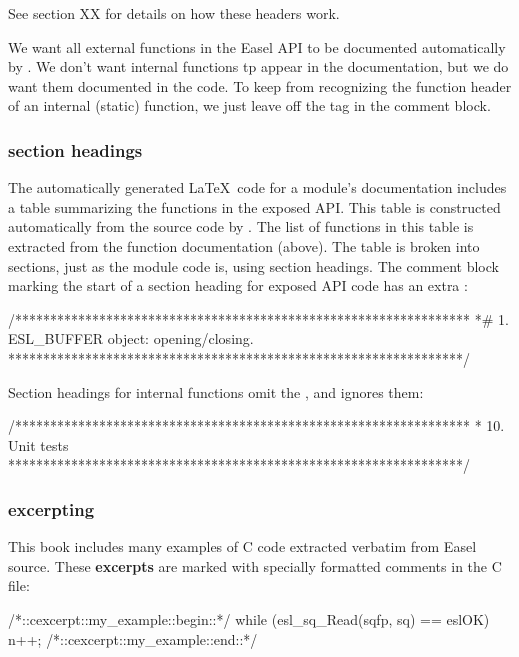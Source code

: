 See section XX for details on how these headers work.

We want all external functions in the Easel API to be documented
automatically by . We don't want internal functions tp
appear in the documentation, but we do want them documented in the
code.  To keep  from recognizing the function header of
an internal (static) function, we just leave off the 
tag in the comment block.   

\subsubsection{section headings}

The automatically generated \LaTeX\ code for a module's documentation
includes a table summarizing the functions in the exposed API. This
table is constructed automatically from the source code by
. The list of functions in this table is extracted
from the function documentation (above). The table is broken into
sections, just as the module code is, using section headings. The
comment block marking the start of a section heading for exposed API
code has an extra \ccode{\#}:

\begin{cchunk}
/*****************************************************************
 *# 1. ESL_BUFFER object: opening/closing.
 *****************************************************************/
\end{cchunk}

Section headings for internal functions omit the \ccode{\#}, and
 ignores them:

\begin{cchunk}
/*****************************************************************
 * 10. Unit tests
 *****************************************************************/
\end{cchunk}

\subsubsection{excerpting}

This book includes many examples of C code extracted verbatim from
Easel source.  These {\bfseries excerpts} are marked with specially
formatted comments in the C file:

\begin{cchunk}
/*::cexcerpt::my_example::begin::*/
   while (esl_sq_Read(sqfp, sq) == eslOK)
     { n++; }
/*::cexcerpt::my_example::end::*/
\end{cchunk}

